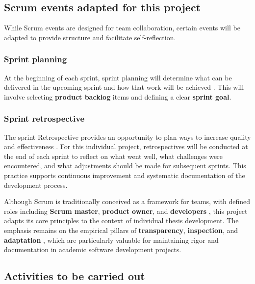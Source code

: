 \subsection{Scrum events adapted for this project}

While Scrum events are designed for team collaboration, certain events will be adapted to provide structure and facilitate self-reflection.

\subsubsection{Sprint planning}

At the beginning of each sprint, sprint planning will determine what can be delivered in the upcoming sprint and how that work will be achieved \parencite{schwaber2020scrum}. This will involve selecting \textbf{product backlog} items and defining a clear \textbf{sprint goal}.

\subsubsection{Sprint retrospective}

The sprint Retrospective provides an opportunity to plan ways to increase quality and effectiveness \parencite{schwaber2020scrum}. For this individual project, retrospectives will be conducted at the end of each sprint to reflect on what went well, what challenges were encountered, and what adjustments should be made for subsequent sprints. This practice supports continuous improvement and systematic documentation of the development process.

Although Scrum is traditionally conceived as a framework for teams, with defined roles including \textbf{Scrum master}, \textbf{product owner}, and \textbf{developers} \parencite{schwaber2020scrum}, this project adapts its core principles to the context of individual thesis development. The emphasis remains on the empirical pillars of \textbf{transparency}, \textbf{inspection}, and \textbf{adaptation} \parencite{schwaber2020scrum}, which are particularly valuable for maintaining rigor and documentation in academic software development projects.

\subsection{Activities to be carried out}

